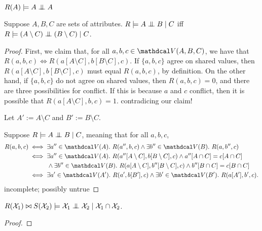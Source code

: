 \begin{prop}
    $R(A) \models A \mathrel{\perp\mspace{-10mu}\perp} A$
\end{prop}


\begin{prop}
    Suppose $A,B,C$ are sets of attributes. 
    $R \models A \mathrel{\perp\mspace{-10mu}\perp} B \mid C$ 
    iff 
    $R \models (A \setminus C) \mathrel{\perp\mspace{-10mu}\perp} (B \setminus C) \mid C$.
\end{prop}
\begin{proof}
    First, we claim that, for all $a,b,c \in \V(A,B,C)$, we have that $R(a,b,c) \iff R(a[A\setminus C], b[B\setminus C],c)$.
    If $\{a,b,c\}$ agree on shared values, then $R(a[A\setminus C], b[B\setminus C],c)$ must equal $R(a,b,c)$, by definition.
    On the other hand, if $\{a,b,c\}$ do not agree on shared values, then $R(a,b,c) = 0$, and there are three possibilities for conflict.
    If this is because $a$ and $c$ conflict, then it is possible that $R(a[A\setminus C],b,c) = 1$. {\color{red} contradicing our claim!}
    
    Let $A' := A \setminus C$ and $B' := B \setminus C$. 
    
        
    Suppose $R \models A \mathrel{\perp\mspace{-10mu}\perp} B \mid C$, meaning that for all $a,b,c$, 
    \begin{align*}
        R(a,b,c)
         &\iff \exists a'' \in \V (A).~ R(a'',b,c) \land \exists b'' \in \V (B).~R(a,b'',c) \\
        &\iff \exists a'' \in \V (A).~ R(a''[A\setminus C],b[B\setminus C],c) \land a''[A\cap C] = c[A \cap C]
            \\&\qquad\quad\land \exists b'' \in \V (B).~R(a[A\setminus C],b''[B\setminus C],c) \land b''[B\cap C] = c[B \cap C] 
            \\
        &\iff \exists a' \in \V (A').~ R(a', b[B'], c) 
            \land \exists b' \in \V (B').~R(a[A'],b',c).
    \end{align*}
    {\color{red} incomplete; possibly untrue}
\end{proof}

\begin{prop}
    $R(\mathcal X_1) \bowtie S(\mathcal X_2) \models \mathcal X_1 \mathrel{\perp\mspace{-10mu}\perp} \mathcal X_2 \mid \mathcal X_1 \cap \mathcal X_2$.
\end{prop}
\begin{proof}
    
\end{proof}

